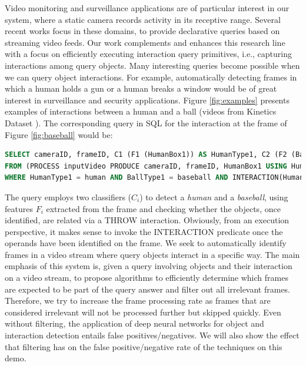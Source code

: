 \documentclass[sigconf]{acmart}
\begin{document}
Video monitoring and surveillance applications are of particular interest in our system, where a static camera records activity in its receptive range. Several recent works \cite{kang2017noscope, kang2018blazeit, koudas2020video, Xarchakos2019} focus in these domains, to provide declarative queries based on streaming video feeds. Our work complements and enhances this research line with a focus on efficiently executing interaction query primitives, i.e., capturing interactions among query objects. 
Many interesting queries become possible when we can query object interactions. For example, automatically detecting frames in which a human holds a gun or a human breaks a window would be of great interest in surveillance and security applications. 
Figure \ref{fig:examples} presents examples of interactions between a human and a ball (videos from Kinetics Dataset \cite{carreira2019short}). The corresponding query in SQL for the interaction at the frame of Figure \ref{fig:baseball} would be:
\begin{lstlisting}[language = SQL, keywordstyle=\color{blue!100}, 
    commentstyle=\color{red!50!green!50!blue!50}, 
    rulesepcolor=\color{red!20!green!20!blue!20}, 
    basicstyle=\footnotesize\ttfamily,
    breaklines=true,]
SELECT cameraID, frameID, C1 (F1 (HumanBox1)) AS HumanType1, C2 (F2 (Ballbox1)) AS BallType1,
FROM (PROCESS inputVideo PRODUCE cameraID, frameID, HumanBox1 USING HumanDetector, BallBox1 USING BallDetector) 
WHERE HumanType1 = human AND BallType1 = baseball AND INTERACTION(HumanType1, BallType1) = THROW
\end{lstlisting}
The query employs two classifiers ($C_i$) to detect a \emph{human} and a \emph{baseball}, using features $F_i$ extracted from the frame and checking whether the objects, once identified, are related via a THROW interaction. Obviously, from an execution perspective, it makes sense to invoke the INTERACTION predicate once the operands have been identified on the frame. We seek to automatically identify frames in a video stream where query objects interact in a specific way. 
The main emphasis of this system is, given a query involving objects and their interaction on a video stream, to propose algorithms to efficiently determine which frames are expected to be part of the query answer and filter out all irrelevant frames. Therefore, we try to increase the frame processing rate as frames that are considered irrelevant will not be processed further but skipped quickly. Even without filtering, the application of deep neural networks for object and interaction detection entails false positives/negatives. We will also show the effect that filtering has on the false positive/negative rate of the techniques on this demo. 
 
\end{document}
